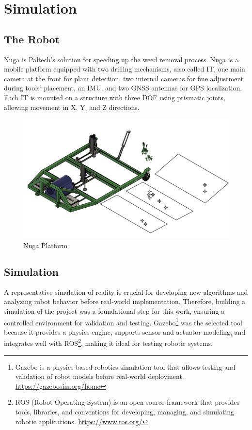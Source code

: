 \chapter{Simulation}\label{ch:simulation}
\section{The Robot}\label{sec:nuga}
Nuga is Paltech's solution for speeding up the weed removal process. Nuga is a mobile platform equipped with two drilling mechanisms, also called \ac{IT}, one main camera at the front for plant detection, two internal cameras for fine adjustment during tools' placement, an IMU, and two GNSS antennas for GPS localization. Each \ac{IT} is mounted on a structure with three \ac{DOF} using prismatic joints, allowing movement in X, Y, and Z directions.

\begin{figure}[bth]
    \centering
    \includegraphics[width=0.7\linewidth]{gfx/ch02/nuga_cad.png}
    \caption{Nuga Platform}
    \label{fig:nuga-cad}
\end{figure}





\section{Simulation}\label{sec:simulation}
A representative simulation of reality is crucial for developing new algorithms and analyzing robot behavior before real-world implementation. Therefore, building a simulation of the project was a foundational step for this work, ensuring a controlled environment for validation and testing. Gazebo\footnote{Gazebo is a physics-based robotics simulation tool that allows testing and validation of robot models before real-world deployment. \url{https://gazebosim.org/home}} was the selected tool because it provides a physics engine, supports sensor and actuator modeling, and integrates well with ROS\footnote{ROS (Robot Operating System) is an open-source framework that provides tools, libraries, and conventions for developing, managing, and simulating robotic applications. \url{https://www.ros.org/}}, making it ideal for testing robotic systems.

